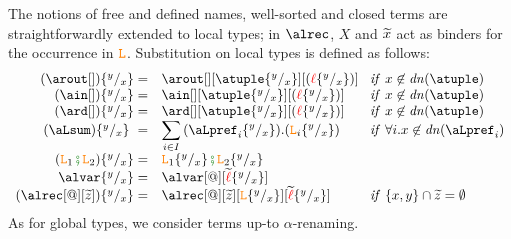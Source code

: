 The notions of free and defined names, well-sorted and closed terms
are straightforwardly extended to local types; in $\alrec$, $X$ and
$\widetilde{x}$ act as binders for the occurrence in $\texttt{\textcolor{orange}L}$.
%
%
%
Substitution on local types is defined as follows:
% 
 \[
\begin{array}{rl@{\hspace{.3cm}}l}
  (\arout[]) \sust x y  = &  \arout[][\atuple\sust x y][(\alocvar\sust x y)] &  {\it if}\  x\not\in\dn\atuple
  \\
  (\ain[]) \sust x y  = &  \ain[][\atuple\sust x y][(\alocvar\sust x y)] &  {\it if}\  x\not\in\dn\atuple
  \\
  (\ard[]) \sust x y  = &  \ard[][\atuple\sust x y][(\alocvar\sust x y)] &  {\it if}\  x\not\in\dn\atuple
  \\
   (\aLsum)\sust x y  = & \displaystyle{\sum_{i\in I} {(\aLpref_{i}\sust x y).(\aL_{i}\sust x y)}}
   &  {\it if}\  \forall i. x\not\in\dn{\aLpref_i}
  \\
  (\aL_1\lseqop\aL_2)\sust x y  = &  \aL_1\sust x y\lseqop  \aL_2\sust x y 
  \\
  \alvar\sust x y  = & \alvar[@][\seq\alocvar\sust x y]  
  \\
  (\alrec[@][\seq z])\sust x y  = & \alrec[@][\seq z][\aL\sust x y][\seq\alocvar\sust x y] &  {\it if}\  \{x,y\}\cap\seq z = \emptyset
\end{array}
\]
%
%
%
%
%
As for global types, we consider terms up-to $\alpha$-renaming.
 
